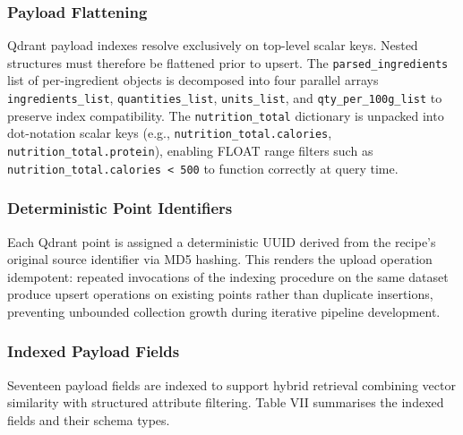 \documentclass[conference]{IEEEtran}
\begin{document}
\subsubsection{Payload Flattening}
Qdrant payload indexes resolve exclusively on top-level scalar keys. Nested structures must therefore be flattened prior to upsert. The \texttt{parsed\_ingredients} list of per-ingredient objects is decomposed into four parallel arrays \texttt{ingredients\_list}, \texttt{quantities\_list},
\texttt{units\_list}, and \texttt{qty\_per\_100g\_list} to preserve index compatibility. The \texttt{nutrition\_total} dictionary is unpacked into dot-notation scalar keys (e.g.,
\texttt{nutrition\_total.calories},
\texttt{nutrition\_total.protein}), enabling FLOAT range filters such as \texttt{nutrition\_total.calories < 500} to function correctly at query time.

\subsubsection{Deterministic Point Identifiers}
Each Qdrant point is assigned a deterministic UUID derived from the recipe's original source identifier via MD5 hashing. This renders the upload operation idempotent: repeated invocations of the indexing procedure on the same dataset produce upsert operations on existing points rather than duplicate insertions, preventing unbounded collection growth during iterative pipeline development.

\subsubsection{Indexed Payload Fields}
Seventeen payload fields are indexed to support hybrid retrieval combining vector similarity with structured attribute filtering. Table VII summarises the indexed fields and their schema types.
\end{document}
